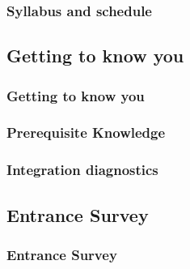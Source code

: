 \documentclass[pdftex, brazil, 12pt, twoside]{article}
\begin{document}
\subsubsection{Syllabus and schedule}
\label{gs-syllabus-syllabus}


\subsection{Getting to know you}
\label{gs-know}

\subsubsection{Getting to know you}
\label{gs-know-know}

\subsubsection{Prerequisite Knowledge}
\label{gs-know-pre}

\subsubsection{Integration diagnostics}
\label{gs-know-diag}


\subsection{Entrance Survey}
\label{gs-survey}

\subsubsection{Entrance Survey}
\label{gs-survey-survey}




\newpage
\end{document}
